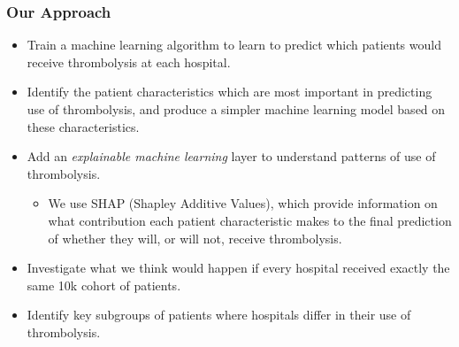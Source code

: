 \begin{frame}
\frametitle{Our Approach}

\small

\begin{itemize}
    \item Train a machine learning algorithm to learn to predict which patients would receive thrombolysis at each hospital. %
    \item Identify the patient characteristics which are most important in predicting use of thrombolysis, and produce a simpler machine learning model based on these characteristics. %
    \item Add an \emph{explainable machine learning} layer to understand patterns of use of thrombolysis.
    \begin{itemize}
        \footnotesize
        \item We use SHAP (Shapley Additive Values), which provide information on what contribution each patient characteristic makes to the final prediction of whether they will, or will not, receive thrombolysis. %
    \end{itemize}
    \item Investigate what we think would happen if every hospital received exactly the same 10k cohort of patients. %
    \item Identify key subgroups of patients where hospitals differ in their use of thrombolysis.
\end{itemize}

\vspace{3mm}

\end{frame}